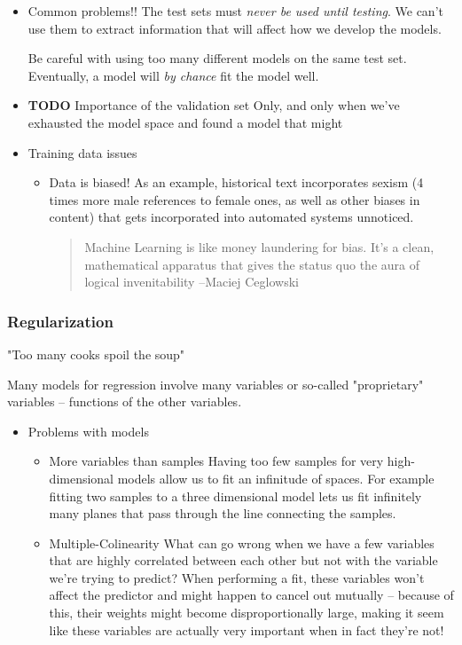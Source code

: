 \documentclass[11pt]{article}
\begin{document}
\begin{itemize}
\begin{itemize}
\item Common problems!!
\label{sec-3-3-1-8}
The test sets must \emph{never be used until testing}. We can't use them to extract information that will affect how we develop the models.

Be careful with using too many different models on the same test set. Eventually, a model will \emph{by chance} fit the model well.

\item {\bfseries\sffamily TODO} Importance of the validation set
\label{sec-3-3-1-9}
Only, and only when we've exhausted the model space and found a model that might

\item Training data issues
\label{sec-3-3-1-10}

\begin{itemize}
\item Data is biased!
\label{sec-3-3-1-10-1}
As an example, historical text incorporates sexism (4 times more male references to female ones, as well as other biases in content) that gets incorporated into automated systems unnoticed.

\begin{quote}
Machine Learning is like money laundering for bias. It's a clean, mathematical apparatus that gives the status quo the aura of logical invenitability
--Maciej Ceglowski
\end{quote}
\end{itemize}
\end{itemize}

\subsubsection*{Regularization}
\label{sec-3-3-2}
"Too many cooks spoil the soup"

Many models for regression involve many variables or so-called "proprietary" variables -- functions of the other variables.

\begin{itemize}
\item Problems with models
\label{sec-3-3-2-1}
\begin{itemize}
\item More variables than samples
\label{sec-3-3-2-1-1}
Having too few samples for very high-dimensional models allow us to fit an infinitude of spaces. For example fitting two samples to a three dimensional model lets us fit infinitely many planes that pass through the line connecting the samples.
\item Multiple-Colinearity
\label{sec-3-3-2-1-2}
What can go wrong when we have a few variables that are highly correlated between each other but not with the variable we're trying to predict? When performing a fit, these variables won't affect the predictor and might happen to cancel out mutually -- because of this, their weights might become disproportionally large, making it seem like these variables are actually very important when in fact they're not!
\end{itemize}



\end{itemize}
\end{itemize}
\end{document}
